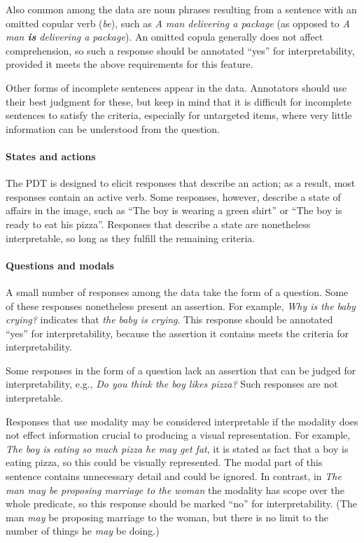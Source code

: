\documentclass[12pt,notitlepage]{article}
\begin{document}
Also common among the data are noun phrases resulting from a sentence with an omitted copular verb (\textit{be}), such as \textit{A man delivering a package} (as opposed to \textit{A man \textbf{is} delivering a package}). An omitted copula generally does not affect comprehension, so such a response should be annotated ``yes'' for interpretability, provided it meets the above requirements for this feature.

Other forms of incomplete sentences appear in the data. Annotators should use their best judgment for these, but keep in mind that it is difficult for incomplete sentences to satisfy the criteria, especially for untargeted items, where very little information can be understood from the question.

\paragraph{States and actions} \label{para:interp-question} The PDT is designed to elicit responses that describe an action; as a result, most responses contain an active verb. Some responses, however, describe a state of affairs in the image, such as ``The boy is wearing a green shirt'' or ``The boy is ready to eat his pizza''. Responses that describe a state are nonetheless interpretable, so long as they fulfill the remaining criteria.

\paragraph{Questions and modals} \label{para:interp-question} A small number of responses among the data take the form of a question. Some of these responses nonetheless present an assertion. For example, \textit{Why is the baby crying?} indicates that \textit{the baby is crying}. This response should be annotated ``yes'' for interpretability, because the assertion it contains meets the criteria for interpretability.

Some responses in the form of a question lack an assertion that can be judged for interpretability, e.g., \textit{Do you think the boy likes pizza?} Such responses are not interpretable.

Responses that use modality may be considered interpretable if the modality does not effect information crucial to producing a visual representation. For example, \textit{The boy is eating so much pizza he may get fat}, it is stated as fact that a boy is eating pizza, so this could be visually represented. The modal part of this sentence contains unnecessary detail and could be ignored. In contrast, in \textit{The man may be proposing marriage to the woman} the modality has scope over the whole predicate, so this response should be marked ``no'' for interpretability. (The man \textit{may} be proposing marriage to the woman, but there is no limit to the number of things he \textit{may} be doing.)
\end{document}

